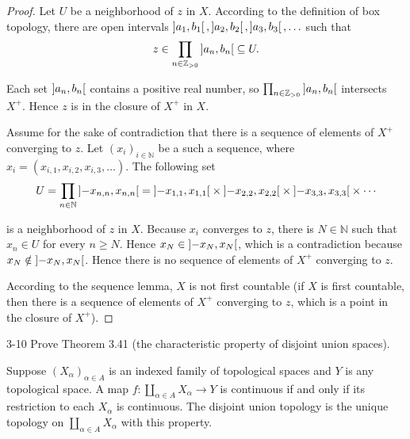 \begin{proof}
	Let $U$ be a neighborhood of $z$ in $X$. According to the definition of box topology, there are open intervals $\left]{a_{1}, b_{1}}\right[, \left]{a_{2}, b_{2}}\right[, \left]{a_{3}, b_{3}}\right[, \ldots$ such that
	\begin{align*}
		z \in \prod_{n\in\mathbb{Z}_{> 0}}\left]{a_{n}, b_{n}}\right[ \subseteq U.
	\end{align*}

	Each set $\left]{a_{n}, b_{n}}\right[$ contains a positive real number, so $\prod_{n\in\mathbb{Z}_{> 0}}\left]{a_{n}, b_{n}}\right[$ intersects $X^{+}$. Hence $z$ is in the closure of $X^{+}$ in $X$.

	Assume for the sake of contradiction that there is a sequence of elements of $X^{+}$ converging to $z$. Let ${(x_{i})}_{i\in\mathbb{N}}$ be a such a sequence, where $x_{i} = (x_{i,1}, x_{i,2}, x_{i,3}, \ldots)$. The following set
	\begin{align*}
		U = \prod_{n\in\mathbb{N}}\left]{-x_{n,n}, x_{n,n}}\right[ = \left]{-x_{1,1}, x_{1,1}}\right[\times \left]{-x_{2,2}, x_{2,2}}\right[ \times \left]{-x_{3,3}, x_{3,3}}\right[\times \cdots
	\end{align*}

	is a neighborhood of $z$ in $X$. Because $x_{i}$ converges to $z$, there is $N\in\mathbb{N}$ such that $x_{n}\in U$ for every $n\geq N$. Hence $x_{N} \in \left]{-x_{N}, x_{N}}\right[$, which is a contradiction because $x_{N} \notin \left]{-x_{N}, x_{N}}\right[$. Hence there is no sequence of elements of $X^{+}$ converging to $z$.

	According to the sequence lemma, $X$ is not first countable (if $X$ is first countable, then there is a sequence of elements of $X^{+}$ converging to $z$, which is a point in the closure of $X^{+}$).
\end{proof}

\begin{problem}{3-10}
Prove Theorem 3.41 (the characteristic property of disjoint union spaces).

Suppose ${(X_{\alpha})}_{\alpha\in A}$ is an indexed family of topological spaces and $Y$ is any topological space. A map $f: \coprod_{\alpha\in A}X_{\alpha}\to Y$ is continuous if and only if its restriction to each $X_{\alpha}$ is continuous. The disjoint union topology is the unique topology on $\coprod_{\alpha\in A}X_{\alpha}$ with this property.
\end{problem}

